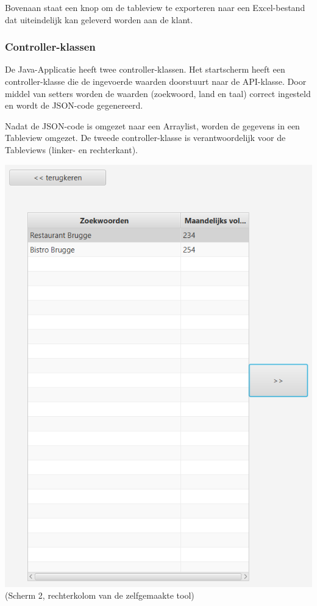 Bovenaan staat een knop om de tableview te exporteren naar een Excel-bestand dat uiteindelijk kan geleverd worden aan de klant. 


\subsubsection{Controller-klassen}
\label{ch: Controller-klassen}

De Java-Applicatie heeft twee controller-klassen. Het startscherm heeft een controller-klasse die de ingevoerde waarden doorstuurt naar de API-klasse. Door middel van setters worden de waarden (zoekwoord, land en taal) correct ingesteld en wordt de JSON-code gegenereerd. 

Nadat de JSON-code is omgezet naar een Arraylist, worden de gegevens in een Tableview omgezet. De tweede controller-klasse is verantwoordelijk voor de Tableviews (linker- en rechterkant). 

\includegraphics[width=\linewidth]{Bachelorproef/bachelor/img/scherm2linkerkant.PNG}
(Scherm 2, rechterkolom van de zelfgemaakte tool)